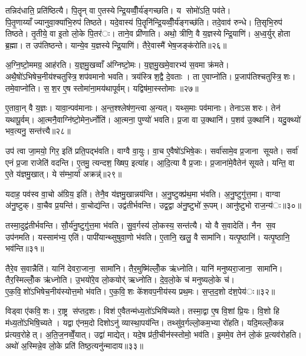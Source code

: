 तन्निद॑धाति॒ प्रति॑ष्ठित्यै। पि॒तॄन् वा ए॒तस्येन्द्रि॒यव्वीँ॒र्य॑ङ्गच्छति। य सोमो॑ऽति॒ पव॑ते। पि॒तृ॒णाय्याँज्यानुवा॒क्या॑भि॒रुप॑ तिष्ठते। यदे॒वास्य॑ पि॒तॄनि॑न्द्रि॒यव्वीँ॒र्य॑ङ्गच्छ॑ति। तदे॒वाव॑ रुन्धे। ति॒सृभि॒रुप॑ तिष्ठते। तृ॒तीये॒ वा इ॒तो लो॒के पि॒तर॑ः। ताने॒व प्री॑णाति। अथो॒ त्रीणि॒ वै य॒ज्ञस्येन्द्रि॒याणि॑। अ॒ध्व॒र्युर् होता ब्र॒ह्मा। त उप॑तिष्ठन्ते। यान्ये॒व य॒ज्ञस्येन्द्रि॒याणि॑। तैरे॒वास्मै॑ भेष॒जङ्क॑रोति॥२६॥


अ॒ग्नि॒ष्टो॒ममग्र॒ आह॑रति। य॒ज्ञ॒मु॒खव्वाँ अ॑ग्निष्टो॒मः। य॒ज्ञ॒मु॒खमे॒वारभ्य॑ स॒वमा क्र॑मते। अथै॒षो॑ऽभिषेच॒नीय॑श्चतुस्त्रि॒शप॑वमानो भवति। त्रय॑स्त्रिश॒द्वै दे॒वताः। ता ए॒वाप्नो॑ति। प्र॒जाप॑तिश्चतुस्त्रि॒शः। तमे॒वाप्नो॑ति। स॒श॒र ए॒ष स्तोमा॑ना॒मय॑थापूर्वम्। यद्विष॑मा॒स्स्तोमाः॥२७॥

ए॒तावा॒न् वै य॒ज्ञः। यावा॒न्पव॑मानाः। अ॒न्त॒श्श्लेष॑ण॒न्त्वा अ॒न्यत्। यथ्स॒माः पव॑मानाः। तेनाऽसशरः। तेन॑ यथापू॒र्वम्। आ॒त्मनै॒वाग्नि॑ष्टो॒मेन॒र्ध्नोति॑। आ॒त्मना॒ पुण्यो॑ भवति। प्र॒जा वा उ॒क्थानि॑। प॒शव॑ उ॒क्थानि॑। यदु॒क्थ्यो॑ भव॒त्यनु॒ सन्त॑त्त्यै॥२८॥


उप॑ त्वा जा॒मयो॒ गिर॒ इति॑ प्रति॒पद्भ॑वति। वाग्वै वा॒युः। वा॒च ए॒वैषो॑ऽभिषे॒कः। सर्वा॑सामे॒व प्र॒जाना सूयते। सर्वा॑ एनं प्र॒जा राजेति॑ वदन्ति। ए॒तमु॒ त्यन्दश॒ ख्षिप॒ इत्या॑ह। आ॒दि॒त्या वै प्र॒जाः। प्र॒जाना॑मे॒वैतेन॑ सूयते। यन्ति॒ वा ए॒ते य॑ज्ञमु॒खात्। ये स॑म्भा॒र्या॑ अक्रन्न्॑॥२९॥

यदाह॒ पव॑स्व वा॒चो अ॑ग्रिय॒ इति॑। तेनै॒व य॑ज्ञमु॒खान्नय॑न्ति। अ॒नु॒ष्टुक्प्र॑थ॒मा भ॑वति। अ॒नु॒ष्टुगु॑त्त॒मा। वाग्वा अ॑नु॒ष्टुक्। वा॒चैव प्र॒यन्ति॑। वा॒चोद्य॑न्ति। उद्व॑तीर्भवन्ति। उद्व॒द्वा अ॑नु॒ष्टुभो॑ रू॒पम्। आनु॑ष्टुभो राज॒न्य॑ः॥३०॥

तस्मा॒दुद्व॑तीर्भवन्ति। सौ॒र्य॑नु॒ष्टुगु॑त्त॒मा भ॑वति। सु॒व॒र्गस्य॑ लो॒कस्य॒ सन्त॑त्यै। यो वै स॒वादेति॑। नैन स॒व उप॑नमति। यस्साम॑भ्य॒ एति॑। पापी॑यान्थ्सुषुवा॒णो भ॑वति। ए॒तानि॒ खलु॒ वै सामा॑नि। यत्पृ॒ष्ठानि॑। यत्पृ॒ष्ठानि॒ भव॑न्ति॥३१॥

तैरे॒व स॒वान्नैति॑। यानि॑ देवरा॒जाना॒ सामा॑नि। तैर॒मुष्मि॑ल्लोँ॒क ऋ॑ध्नोति। यानि॑ मनुष्यरा॒जाना॒ सामा॑नि। तैर॒स्मिल्लोँ॒क ऋ॑ध्नोति। उ॒भयो॑रे॒व लो॒कयोर्॑ ऋध्नोति। दे॒व॒लो॒के च॑ मनुष्यलो॒के च॑। ए॒क॒वि॒शो॑ऽभिषेच॒नीय॑स्योत्त॒मो भ॑वति। ए॒क॒वि॒शः के॑शवप॒नीय॑स्य प्रथ॒मः। स॒प्त॒द॒शो द॑श॒पेय॑ः॥३२॥

विड्वा ए॑कवि॒शः। रा॒ष्ट्र स॑प्तद॒शः। विश॑ ए॒वैतन्म॑ध्य॒तो॑ऽभिषि॑च्यते। तस्मा॒द्वा ए॒ष वि॒शां प्रि॒यः। वि॒शो हि म॑ध्य॒तो॑ऽभिषि॒च्यते। यद्वा ए॑नम॒दो दिशोऽनु॑ व्यास्था॒पय॑न्ति। तथ्सु॑व॒र्गल्लो॒कम॒भ्या रो॑हति। यदि॒मल्लोँ॒कन्न प्र॑त्यव॒रोहेत्। अ॒ति॒ज॒नव्वेँ॒यात्। उद्वा॑ माद्येत्। यदे॒ष प्र॑ती॒चीन॑स्स्तोमो॒ भव॑ति। इ॒ममे॒व तेन॑ लो॒कं प्र॒त्यव॑रोहति। अथो॑ अ॒स्मिन्ने॒व लो॒के प्रति॑ तिष्ठ॒त्यनु॑न्मादाय॥३३॥

